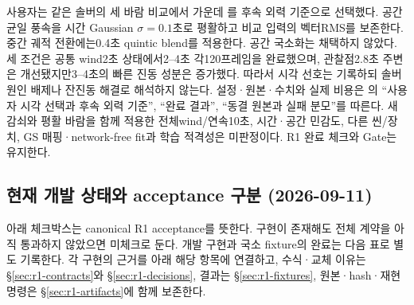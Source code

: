 \documentclass[10pt]{article}
\begin{document}
사용자는 같은 솔버의 세 바람 비교에서 가운데 를 후속 외력 기준으로 선택했다.
공간 균일 풍속을 시간 Gaussian $\sigma=0.1$초로 평활하고 비교 입력의 벡터RMS를 보존한다.
중간 궤적 전환에는0.4초 quintic blend를 적용한다. 공간 국소화는 채택하지 않았다.
세 조건은 공통 wind2초 상태에서2--4초 각120프레임을 완료했으며,
관찰점2.8초 주변은 개선됐지만3--4초의 빠른 진동 성분은 증가했다.
따라서 시각 선호는 기록하되 솔버 원인 배제나 잔진동 해결로 해석하지 않는다.
설정·원본·수치와 실제 비용은 의 ``사용자 시각 선택과 후속 외력 기준'',
``완료 결과'', ``동결 원본과 실패 분모''를 따른다.
새 감쇠와 평활 바람을 함께 적용한 전체wind/연속10초, 시간·공간 민감도,
다른 씬/장치, GS 매핑·network-free fit과 학습 적격성은 미판정이다. R1 완료 체크와 Gate는 유지한다.

\subsection{현재 개발 상태와 acceptance 구분 (2026-09-11)}

아래 체크박스는 canonical R1 acceptance를 뜻한다. 구현이 존재해도 전체 계약을 아직 통과하지
않았으면 미체크로 둔다. 개발 구현과 국소 fixture의 완료는 다음 표로 별도 기록한다.
각 구현의 근거를 아래 해당 항목에 연결하고, 수식·교체 이유는
\S\ref{sec:r1-contracts}와 \S\ref{sec:r1-decisions}, 결과는 \S\ref{sec:r1-fixtures},
원본·hash·재현 명령은 \S\ref{sec:r1-artifacts}에 함께 보존한다.
\end{document}
